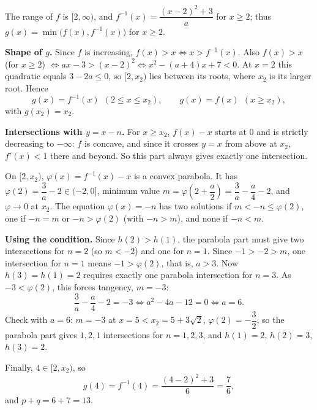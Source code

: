 The range of \(f\) is \([2,\infty)\), and \(f^{-1}(x)=\dfrac{(x-2)^2+3}{a}\) for \(x\ge 2\); thus \(g(x)=\min\bigl(f(x),f^{-1}(x)\bigr)\) for \(x\ge 2\).

\textbf{Shape of \(g\).} Since \(f\) is increasing, \(f(x)>x\iff x>f^{-1}(x)\). Also \(f(x)>x\) (for \(x\ge 2\)) \(\iff ax-3>(x-2)^2\iff x^2-(a+4)x+7<0\). At \(x=2\) this quadratic equals \(3-2a\le 0\), so \([2,x_2)\) lies between its roots, where \(x_2\) is its larger root. Hence
\[
g(x)=f^{-1}(x)\ \ (2\le x\le x_2),\qquad g(x)=f(x)\ \ (x\ge x_2),
\]
with \(g(x_2)=x_2\).

\textbf{Intersections with \(y=x-n\).} For \(x\ge x_2\), \(f(x)-x\) starts at \(0\) and is strictly decreasing to \(-\infty\): \(f\) is concave, and since it crosses \(y=x\) from above at \(x_2\), \(f'(x)<1\) there and beyond. So this part always gives exactly one intersection.

On \([2,x_2)\), \(\varphi(x)=f^{-1}(x)-x\) is a convex parabola. It has \(\varphi(2)=\dfrac{3}{a}-2\in(-2,0]\), minimum value \(m=\varphi\!\left(2+\dfrac {a}{2}\right)=\dfrac{3}{a}-\dfrac {a}{4}-2\), and \(\varphi\to 0\) at \(x_2\). The equation \(\varphi(x)=-n\) has two solutions if \(m<-n\le\varphi(2)\), one if \(-n=m\) or \(-n>\varphi(2)\) (with \(-n>m\)), and none if \(-n<m\).

\textbf{Using the condition.} Since \(h(2)>h(1)\), the parabola part must give two intersections for \(n=2\) (so \(m<-2\)) and one for \(n=1\). Since \(-1>-2>m\), one intersection for \(n=1\) means \(-1>\varphi(2)\), that is, \(a>3\). Now \(h(3)=h(1)=2\) requires exactly one parabola intersection for \(n=3\). As \(-3<\varphi(2)\), this forces tangency, \(m=-3\):
\[
\dfrac{3}{a}-\dfrac {a}{4}-2=-3\iff a^2-4a-12=0\iff a=6.
\]
Check with \(a=6\): \(m=-3\) at \(x=5<x_2=5+3\sqrt2\), \(\varphi(2)=-\dfrac{3}{2}\), so the parabola part gives \(1,2,1\) intersections for \(n=1,2,3\), and \(h(1)=2\), \(h(2)=3\), \(h(3)=2\).

Finally, \(4\in[2,x_2)\), so
\[
g(4)=f^{-1}(4)=\dfrac{(4-2)^2+3}{6}=\dfrac{7}{6},
\]
and \(p+q=6+7=\boxed{13}\).
